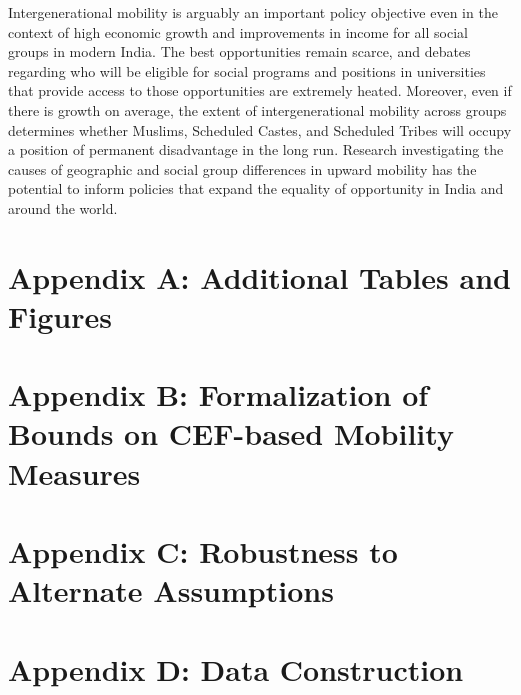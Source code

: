 \documentclass[12pt,letterpaper]{article}
\numberwithin{equation}{section}
\begin{document}
Intergenerational mobility is arguably an important policy objective even in the context of high economic growth and improvements in income for all social groups in modern India. The best opportunities remain scarce, and debates regarding who will be eligible for social programs and positions in universities that provide access to those opportunities are extremely heated. Moreover, even if there is growth on average, the extent of intergenerational mobility across groups determines whether Muslims, Scheduled Castes, and Scheduled Tribes will occupy a position of permanent disadvantage in the long run. Research investigating the causes of geographic and social group differences in upward mobility has the potential to inform policies that expand the equality of opportunity in India and around the world.

\begin{appendix}
\pagestyle{fancy}
  \newpage

 {  \singlespace
  
  
}

  \newpage
  
  

  \section{Appendix A: Additional Tables and Figures}
  \setcounter{table}{0}
  \renewcommand{\thetable}{A\arabic{table}}
  \setcounter{figure}{0}
  \renewcommand{\thefigure}{A\arabic{figure}}

  
  
  
  \newpage

  {\normalsize

  \section{Appendix B: Formalization of Bounds on CEF-based Mobility Measures}
  \label{app:formal_model}
  \setcounter{table}{0}
  \renewcommand{\thetable}{B\arabic{table}}
  \setcounter{figure}{0}
  \renewcommand{\thefigure}{B\arabic{figure}}
  

  \newpage
    
  \section{Appendix C: Robustness to Alternate Assumptions}
  \label{app:robust}
  \setcounter{table}{0}
  \renewcommand{\thetable}{C\arabic{table}}
  \setcounter{figure}{0}
  \renewcommand{\thefigure}{C\arabic{figure}}
  

  \newpage
  \floatbarrier
  
  \section{Appendix D: Data Construction}
  \label{app:data}
  
}
\end{appendix}
\end{document}
